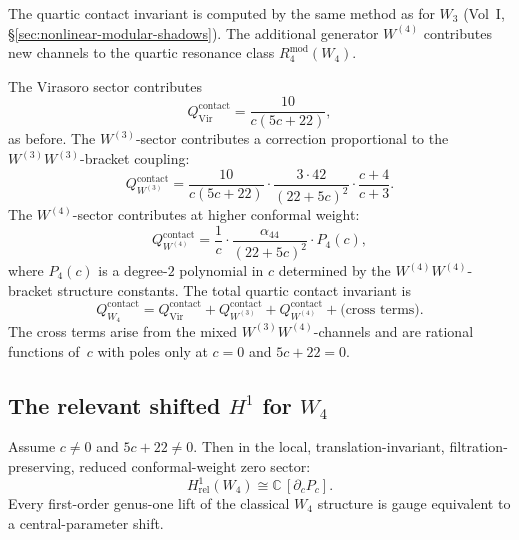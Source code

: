 \begin{computation}
The quartic contact invariant is computed by the same method as for $W_3$
(Vol~I, \S\ref*{sec:nonlinear-modular-shadows}). The additional
generator $W^{(4)}$ contributes new channels to the quartic resonance
class $R_4^{\mathrm{mod}}(W_4)$.

The Virasoro sector contributes
\[
Q^{\mathrm{contact}}_{\mathrm{Vir}} = \frac{10}{c(5c+22)},
\]
as before. The $W^{(3)}$-sector contributes a correction proportional
to the $W^{(3)}W^{(3)}$-bracket coupling:
\[
Q^{\mathrm{contact}}_{W^{(3)}}
=
\frac{10}{c(5c+22)}
\cdot
\frac{3 \cdot 42}{(22+5c)^2}
\cdot
\frac{c+4}{c+3}.
\]
The $W^{(4)}$-sector contributes at higher conformal weight:
\[
Q^{\mathrm{contact}}_{W^{(4)}}
=
\frac{1}{c}
\cdot
\frac{\alpha_{44}}{(22+5c)^2}
\cdot P_4(c),
\]
where $P_4(c)$ is a degree-$2$ polynomial in $c$ determined by the
$W^{(4)}W^{(4)}$-bracket structure constants. The total quartic contact
invariant is
\[
Q^{\mathrm{contact}}_{W_4}
=
Q^{\mathrm{contact}}_{\mathrm{Vir}}
+ Q^{\mathrm{contact}}_{W^{(3)}}
+ Q^{\mathrm{contact}}_{W^{(4)}}
+ \text{(cross terms)}.
\]
The cross terms arise from the mixed $W^{(3)}W^{(4)}$-channels and are
rational functions of~$c$ with poles only at $c=0$ and $5c+22=0$.
\end{computation}

\subsection{The relevant shifted $H^1$ for $W_4$}

\begin{theorem}
Assume $c \neq 0$ and $5c+22 \neq 0$. Then in the local,
translation-invariant, filtration-preserving, reduced conformal-weight
zero sector:
\[
H^1_{\mathrm{rel}}(W_4) \cong \mathbb{C}\,[\partial_c P_c].
\]
Every first-order genus-one lift of the classical $W_4$ structure
is gauge equivalent to a central-parameter shift.
\end{theorem}


